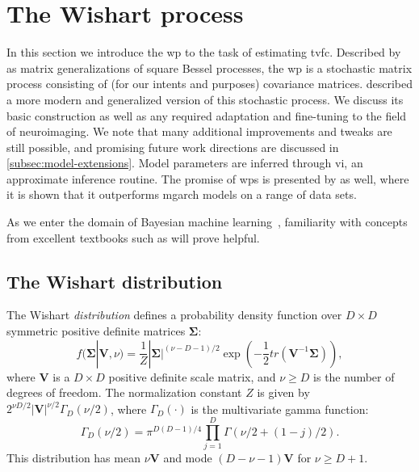 \clearpage
\section{The Wishart process}
\label{sec:wishart-process}

In this section we introduce the \gls{wp} to the task of estimating \gls{tvfc}.
Described by \textcite{Bru1991} as matrix generalizations of square Bessel processes, the \gls{wp} is a stochastic matrix process consisting of (for our intents and purposes) covariance matrices.
\textcite{Wilson2010} described a more modern and generalized version of this stochastic process.
%
We discuss its basic construction as well as any required adaptation and fine-tuning to the field of neuroimaging.
We note that many additional improvements and tweaks are still possible, and promising future work directions are discussed in \cref{subsec:model-extensions}.
Model parameters are inferred through \gls{vi}, an approximate inference routine.
The promise of \glspl{wp} is presented by \textcite{Wilson2010, Heaukulani2019} as well, where it is shown that it outperforms \gls{mgarch} models on a range of data sets.

As we enter the domain of Bayesian machine learning~\parencite{Ghahramani2015}, familiarity with concepts from excellent textbooks such as \textcite{MacKay2002, Bishop2006, Hastie2009, Murphy2012, Murphy2023} will prove helpful.

\subsection{The Wishart distribution}
\label{subsec:wishart-distribution}

The Wishart \emph{distribution} defines a probability density function over $D \times D$ symmetric positive definite matrices $\mathbf{\Sigma}$:
\begin{equation}
  f(\mathbf{\Sigma}|\mathbf{V},\nu) = \frac{1}{Z} |\mathbf{\Sigma}|^{(\nu - D - 1)/2} \exp{(-\frac12tr(\mathbf{V}^{-1}\mathbf{\Sigma}))},
\end{equation}
where $\mathbf{V}$ is a $D \times D$ positive definite scale matrix, and $\nu \geq D$ is the number of degrees of freedom.
The normalization constant $Z$ is given by $2^{\nu D/2}|\mathbf{V}|^{\nu/2}\Gamma_D(\nu/2)$, where $\Gamma_D(\cdot)$ is the multivariate gamma function:
\begin{equation}
  \Gamma_D(\nu/2) = \pi^{D(D-1)/4} \prod_{j=1}^D \Gamma(\nu/2 + (1-j)/2).
\end{equation}
This distribution has mean $\nu \mathbf{V}$ and mode $(D - \nu - 1)\mathbf{V}$ for $\nu \geq D + 1$.


